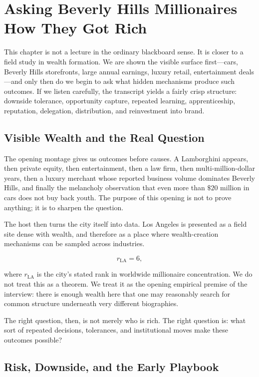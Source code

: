 \chapter{Asking Beverly Hills Millionaires How They Got Rich}

This chapter is not a lecture in the ordinary blackboard sense. It is closer to a field study in wealth formation. We are shown the visible surface first---cars, Beverly Hills storefronts, large annual earnings, luxury retail, entertainment deals---and only then do we begin to ask what hidden mechanisms produce such outcomes. If we listen carefully, the transcript yields a fairly crisp structure: downside tolerance, opportunity capture, repeated learning, apprenticeship, reputation, delegation, distribution, and reinvestment into brand.

\section{Visible Wealth and the Real Question}

The opening montage gives us outcomes before causes. A Lamborghini appears, then private equity, then entertainment, then a law firm, then multi-million-dollar years, then a luxury merchant whose reported business volume dominates Beverly Hills, and finally the melancholy observation that even more than \(\$20\) million in cars does not buy back youth. The purpose of this opening is not to prove anything; it is to sharpen the question.

The host then turns the city itself into data. Los Angeles is presented as a field site dense with wealth, and therefore as a place where wealth-creation mechanisms can be sampled across industries.

\begin{equation}
r_{\mathrm{LA}} = 6,
\end{equation}

where \(r_{\mathrm{LA}}\) is the city's stated rank in worldwide millionaire concentration. We do not treat this as a theorem. We treat it as the opening empirical premise of the interview: there is enough wealth here that one may reasonably search for common structure underneath very different biographies.

The right question, then, is not merely who is rich. The right question is: what sort of repeated decisions, tolerances, and institutional moves make these outcomes possible?

\section{Risk, Downside, and the Early Playbook}

